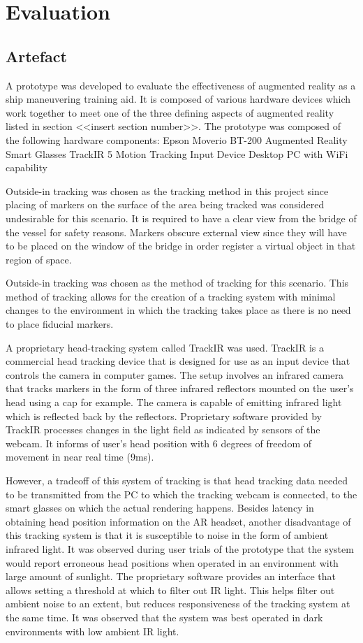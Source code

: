 \chapter{Evaluation}
\section{Artefact}	
A prototype was developed to evaluate the effectiveness of augmented reality as a ship maneuvering training aid. It is composed of various hardware devices which work together to meet one of the three defining aspects of augmented reality listed in section <<insert section number>>. The prototype was composed of the following hardware components:
Epson Moverio BT-200 Augmented Reality Smart Glasses
TrackIR 5 Motion Tracking Input Device
Desktop PC with WiFi capability 

Outside-in tracking was chosen as the tracking method in this project since placing of markers on the surface of the area being tracked was considered undesirable for this scenario. It is required to have a clear view from the bridge of the vessel for safety reasons. Markers obscure external view since they will have to be placed on the window of the bridge in order register a virtual object in that region of space.


Outside-in tracking was chosen as the method of tracking for this scenario. This method of tracking allows for the creation of a tracking system with minimal changes to the environment in which the tracking takes place as there is no need to place fiducial markers. 

A proprietary head-tracking system called TrackIR was used. TrackIR is a commercial head tracking device that is designed for use as an input device that controls the camera in computer games. The setup involves an infrared camera that tracks markers in the form of three infrared reflectors mounted on the user’s head using a cap for example. The camera is capable of emitting infrared light which is reflected back by the reflectors. Proprietary software provided by TrackIR processes changes in the light field as indicated by sensors of the webcam. It informs of user’s head position with 6 degrees of freedom of movement in near real time (9ms). 


However, a tradeoff of this system of tracking is that head tracking data needed to be transmitted from the PC to which the tracking webcam is connected, to the smart glasses on which the actual rendering happens. Besides latency in obtaining head position information on the AR headset, another disadvantage of this tracking system is that it is susceptible to noise in the form of ambient infrared light. It was observed during user trials of the prototype that the system would report erroneous head positions when operated in an environment with large amount of sunlight. The proprietary software provides an interface that allows setting a threshold at which to filter out IR light. This helps filter out ambient noise to an extent, but reduces responsiveness of the tracking system at the same time. It was observed that the system was best operated in dark environments with low ambient IR light.

